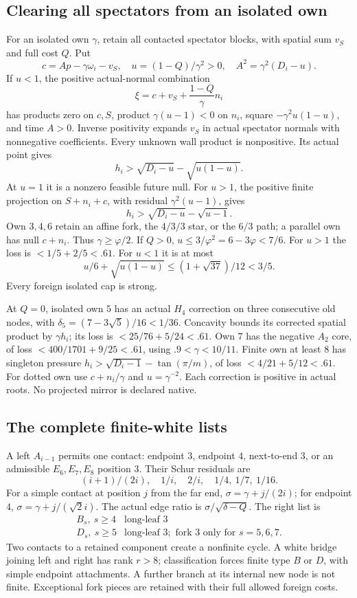 \documentclass[11pt]{article}
\theoremstyle{definition}
\theoremstyle{remark}
\begin{document}
\subsection{Clearing all spectators from an isolated own}
For an isolated own \(\gamma\), retain all contacted spectator
blocks, with spatial sum \(v_S\) and full cost \(Q\). Put
\[
 c=A p-\gamma\omega_i-v_S,\quad
 u=(1-Q)/\gamma^2>0,\quad A^2=\gamma^2(D_i-u).
\]
If \(u<1\), the positive actual-normal combination
\[
 \xi=c+v_S+\frac{1-Q}{\gamma}n_i
\]
has products zero on \(c,S\), product
\(\gamma(u-1)<0\) on \(n_i\), square
\(-\gamma^2u(1-u)\), and time \(A>0\).
Inverse positivity expands \(v_S\) in actual spectator
normals with nonnegative coefficients. Every unknown
wall product is nonpositive. Its actual point gives
\[
 h_i>\sqrt{D_i-u}-\sqrt{u(1-u)}.
\]
At \(u=1\) it is a nonzero feasible future null.
For \(u>1\), the positive finite projection on
\(S+n_i+c\), with residual \(\gamma^2(u-1)\), gives
\[
 h_i>\sqrt{D_i-u}-\sqrt{u-1}.
\]
Own \(3,4,6\) retain an affine fork, the \(4/3/3\)
star, or the \(6/3\) path; a parallel own has null
\(c+n_i\). Thus \(\gamma\geq\varphi/2\).
If \(Q>0\), \(u\leq3/\varphi^2=6-3\varphi<7/6\).
For \(u>1\) the loss is \(<1/5+2/5<.61\).
For \(u<1\) it is at most
\[
 u/6+\sqrt{u(1-u)}
 \leq(1+\sqrt{37})/12<3/5.
\]
Every foreign isolated cap is strong.

At \(Q=0\), isolated own \(5\) has an actual
\(H_4\) correction on three consecutive old nodes,
with \(\delta_5=(7-3\sqrt5)/16<1/36\).
Concavity bounds its corrected spatial product by
\(\gamma h_i\); its loss is \(<25/76+5/24<.61\).
Own \(7\) has the negative \(A_2\) core, of loss
\(<400/1701+9/25<.61\), using \(.9<\gamma<10/11\).
Finite own at least \(8\) has singleton pressure
\(h_i>\sqrt{D_i-1}-\tan(\pi/m)\), of loss
\(<4/21+5/12<.61\).
For dotted own use \(c+n_i/\gamma\) and \(u=\gamma^{-2}\).
Each correction is positive in actual roots.
No projected mirror is declared native.

\subsection{The complete finite-white lists}
A left \(A_{i-1}\) permits one contact: endpoint \(3\),
endpoint \(4\), next-to-end \(3\), or an admissible
\(E_6,E_7,E_8\) position \(3\).
Their Schur residuals are
\[
 (i+1)/(2i),\quad1/i,\quad2/i,\quad1/4,\ 1/7,\ 1/16.
\]
For a simple contact at position \(j\) from the far end,
\(\sigma=\gamma+j/(2i)\); for endpoint \(4\),
\(\sigma=\gamma+j/(\sqrt2i)\).
The actual edge ratio is \(\sigma/\sqrt{\delta-Q}\).
The right list is
\[
\begin{array}{c|l}
B_s,\ s\geq4&\text{long-leaf }3\\
D_s,\ s\geq5&\text{long-leaf }3;
 \text{ fork }3\text{ only for }s=5,6,7.
\end{array}
\]
Two contacts to a retained component create a nonfinite cycle.
A white bridge joining left and right has rank \(r>8\);
classification forces finite type \(B\) or \(D\), with simple
endpoint attachments. A further branch at its internal new
node is not finite. Exceptional fork pieces are retained
with their full allowed foreign costs.
\end{document}
